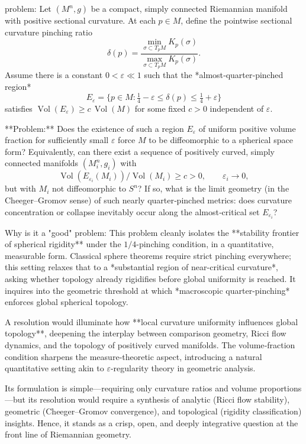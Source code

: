 problem:  
Let \( (M^n,g) \) be a compact, simply connected Riemannian manifold with positive sectional curvature.  
At each \(p\in M\), define the pointwise sectional curvature pinching ratio  
\[
\delta(p)=\frac{\min_{\sigma\subset T_pM}K_p(\sigma)}{\max_{\sigma\subset T_pM}K_p(\sigma)}.
\]  
Assume there is a constant \(0<\varepsilon\ll1\) such that the *almost‑quarter‑pinched region*
\[
E_\varepsilon=\{p\in M:\tfrac{1}{4}-\varepsilon\le\delta(p)\le\tfrac{1}{4}+\varepsilon\}
\]
satisfies \(\operatorname{Vol}(E_\varepsilon)\ge c\,\operatorname{Vol}(M)\) for some fixed \(c>0\) independent of \(\varepsilon\).  

**Problem:**  
Does the existence of such a region \(E_\varepsilon\) of uniform positive volume fraction for sufficiently small \(\varepsilon\) force \(M\) to be diffeomorphic to a spherical space form?  
Equivalently, can there exist a sequence of positively curved, simply connected manifolds \((M_i^n,g_i)\) with  
\[
\operatorname{Vol}(E_{\varepsilon_i}(M_i))/\operatorname{Vol}(M_i)\ge c>0,\qquad \varepsilon_i\to0,
\]  
but with \(M_i\) not diffeomorphic to \(S^n\)?  
If so, what is the limit geometry (in the Cheeger–Gromov sense) of such nearly quarter‑pinched metrics: does curvature concentration or collapse inevitably occur along the almost‑critical set \(E_{\varepsilon_i}\)?  


Why is it a "good" problem:  
This problem cleanly isolates the **stability frontier of spherical rigidity** under the \(1/4\)-pinching condition, in a quantitative, measurable form. Classical sphere theorems require strict pinching everywhere; this setting relaxes that to a *substantial region of near-critical curvature*, asking whether topology already rigidifies before global uniformity is reached. It inquires into the geometric threshold at which *macroscopic quarter‑pinching* enforces global spherical topology.

A resolution would illuminate how **local curvature uniformity influences global topology**, deepening the interplay between comparison geometry, Ricci flow dynamics, and the topology of positively curved manifolds. The volume‑fraction condition sharpens the measure‑theoretic aspect, introducing a natural quantitative setting akin to \(\varepsilon\)-regularity theory in geometric analysis.  

Its formulation is simple—requiring only curvature ratios and volume proportions—but its resolution would require a synthesis of analytic (Ricci flow stability), geometric (Cheeger–Gromov convergence), and topological (rigidity classification) insights. Hence, it stands as a crisp, open, and deeply integrative question at the front line of Riemannian geometry.